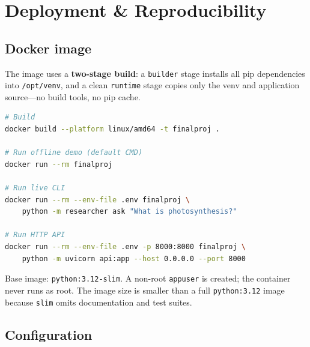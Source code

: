 \documentclass[11pt,a4paper]{article}
\begin{document}
\section{Deployment \& Reproducibility}\label{sec:deploy}

\subsection{Docker image}

The image uses a \textbf{two-stage build}: a \texttt{builder} stage installs all pip dependencies into \texttt{/opt/venv}, and a clean \texttt{runtime} stage copies only the venv and application source---no build tools, no pip cache.

\begin{lstlisting}[style=python,language=bash,numbers=none,basicstyle=\ttfamily\small]
# Build
docker build --platform linux/amd64 -t finalproj .

# Run offline demo (default CMD)
docker run --rm finalproj

# Run live CLI
docker run --rm --env-file .env finalproj \
    python -m researcher ask "What is photosynthesis?"

# Run HTTP API
docker run --rm --env-file .env -p 8000:8000 finalproj \
    python -m uvicorn api:app --host 0.0.0.0 --port 8000
\end{lstlisting}

Base image: \texttt{python:3.12-slim}. A non-root \texttt{appuser} is created; the container never runs as root. The image size is smaller than a full \texttt{python:3.12} image because \texttt{slim} omits documentation and test suites.

\subsection{Configuration}
\end{document}

